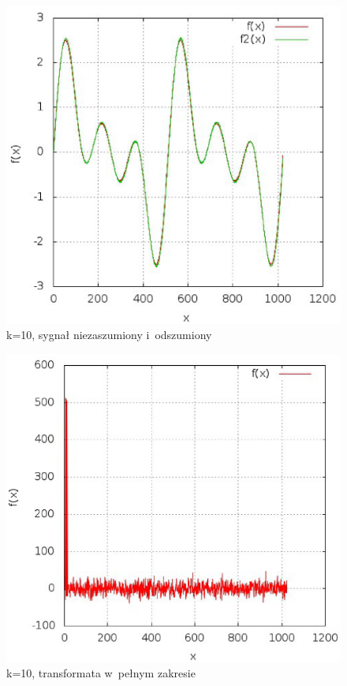 \documentclass[12pt,a4paper]{article}
\begin{document}
\begin{enumerate}
\begin{figure}
\end{figure}
\begin{figure}
\caption{k=10, sygnał niezaszumiony i~odszumiony}
\includegraphics{k_10_3.eps}
\end{figure}
\begin{figure}
\caption{k=10, transformata w~pełnym zakresie}
\includegraphics{k_10_4.eps}

\end{figure}
\end{enumerate}
\end{document}
